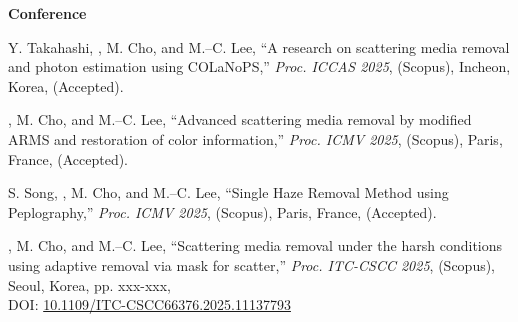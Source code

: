 \documentclass[a4paper,9pt]{extarticle}
\begin{document}
\noindent
\textbf{Conference}
\begin{enumerate}[label={[\arabic*]}, start=1]
    
    \item 
    Y. Takahashi, , M. Cho, and M.--C. Lee, 
    ``A research on scattering media removal and photon estimation using COLaNoPS,''
    \textit{Proc. ICCAS 2025}, (Scopus),
    Incheon, Korea,
    (Accepted).

    \item 
    , M. Cho, and M.--C. Lee, 
    ``Advanced scattering media removal by modified ARMS and restoration of color information,'' 
    \textit{Proc. ICMV 2025}, (Scopus),
    Paris, France,
    (Accepted).
        
    \item 
    S. Song, , M. Cho, and M.--C. Lee, 
    ``Single Haze Removal Method using Peplography,'' 
    \textit{Proc. ICMV 2025}, (Scopus),
    Paris, France,
    (Accepted).

    \item 
    , M. Cho, and M.--C. Lee, 
    ``Scattering media removal under the harsh conditions using adaptive removal via mask for scatter,'' 
    \textit{Proc. ITC-CSCC 2025}, (Scopus),
    Seoul, Korea, 
    pp. xxx-xxx, \\
    DOI: \href{https://doi.org/10.1109/ITC-CSCC66376.2025.11137793}{10.1109/ITC-CSCC66376.2025.11137793}
    

\end{enumerate}
\end{document}
